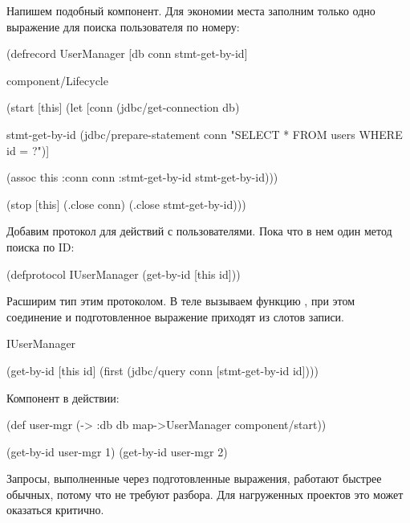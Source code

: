 Напишем подобный компонент. Для экономии места заполним только одно выражение для поиска пользователя по номеру:

\begin{english}
  \begin{clojure}
(defrecord UserManager
    [db
     conn
     stmt-get-by-id]

  component/Lifecycle

  (start [this]
    (let [conn
          (jdbc/get-connection db)

          stmt-get-by-id
          (jdbc/prepare-statement conn
            "SELECT * FROM users WHERE id = ?")]

      (assoc this
             :conn conn
             :stmt-get-by-id stmt-get-by-id)))

  (stop [this]
    (.close conn)
    (.close stmt-get-by-id)))
  \end{clojure}
\end{english}

Добавим протокол для действий с пользователями. Пока что в нем один метод поиска по ID:

\begin{english}
  \begin{clojure}
(defprotocol IUserManager
  (get-by-id [this id]))
  \end{clojure}
\end{english}

Расширим тип  этим протоколом. В теле  вызываем функцию , при этом соединение и подготовленное выражение приходят из слотов записи.

\begin{english}
  \begin{clojure}
IUserManager

(get-by-id [this id]
  (first (jdbc/query conn [stmt-get-by-id id])))
  \end{clojure}
\end{english}

Компонент в действии:

\begin{english}
  \begin{clojure}
(def user-mgr
  (-> {:db db}
      map->UserManager
      component/start))

(get-by-id user-mgr 1)
(get-by-id user-mgr 2)
  \end{clojure}
\end{english}

Запросы, выполненные через подготовленные выражения, работают быстрее обычных, потому что не требуют разбора. Для нагруженных проектов это может оказаться критично.


